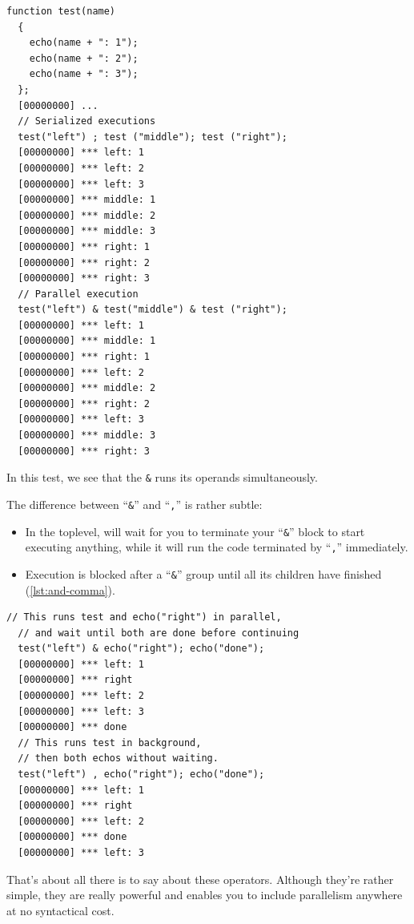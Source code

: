 \documentclass[openright,twoside,12pt]{report}
\newcommand{\lst}[1]{\autoref{lst:#1}}
\begin{document}
\begin{lstlisting}[caption=Parallelism operator,
  label=lst:parallelism-operators]
  function test(name)
  {
    echo(name + ": 1");
    echo(name + ": 2");
    echo(name + ": 3");
  };
  [00000000] ...
  // Serialized executions
  test("left") ; test ("middle"); test ("right");
  [00000000] *** left: 1
  [00000000] *** left: 2
  [00000000] *** left: 3
  [00000000] *** middle: 1
  [00000000] *** middle: 2
  [00000000] *** middle: 3
  [00000000] *** right: 1
  [00000000] *** right: 2
  [00000000] *** right: 3
  // Parallel execution
  test("left") & test("middle") & test ("right");
  [00000000] *** left: 1
  [00000000] *** middle: 1
  [00000000] *** right: 1
  [00000000] *** left: 2
  [00000000] *** middle: 2
  [00000000] *** right: 2
  [00000000] *** left: 3
  [00000000] *** middle: 3
  [00000000] *** right: 3
\end{lstlisting}

In this test, we see that the \texttt{\&} runs its operands
simultaneously.

The difference between ``\texttt{\&}'' and ``\texttt{,}'' is rather
subtle:

\begin{itemize}
\item In the toplevel, will wait for you to terminate your
  ``\texttt{\&}'' block to start executing anything, while it will run
  the code terminated by ``\texttt{,}'' immediately.
\item Execution is blocked after a ``\texttt{\&}'' group until all its
  children have finished (\lst{and-comma}).
\end{itemize}

\begin{lstlisting}[caption=Difference between ``\texttt{\&}'' and
  ``\texttt{,}'', label=lst:and-comma]
  // This runs test and echo("right") in parallel,
  // and wait until both are done before continuing
  test("left") & echo("right"); echo("done");
  [00000000] *** left: 1
  [00000000] *** right
  [00000000] *** left: 2
  [00000000] *** left: 3
  [00000000] *** done
  // This runs test in background,
  // then both echos without waiting.
  test("left") , echo("right"); echo("done");
  [00000000] *** left: 1
  [00000000] *** right
  [00000000] *** left: 2
  [00000000] *** done
  [00000000] *** left: 3
\end{lstlisting}

That's about all there is to say about these operators. Although
they're rather simple, they are really powerful and enables you to
include parallelism anywhere at no syntactical cost.
\end{document}

